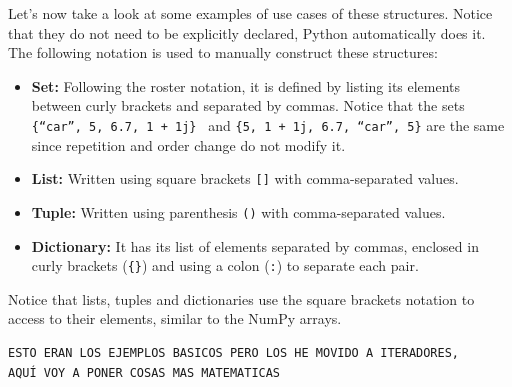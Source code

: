 Let's now take a look at some examples of use cases of these structures. 
Notice that they do not need to be explicitly declared, 
Python automatically does it. 
The following notation is used to manually construct these structures: 
\vspace{-0.5cm}
\begin{itemize}[noitemsep]
    \item \textbf{Set:} Following the roster notation, it is defined by listing its elements between curly brackets and separated by commas.
    Notice that the sets \texttt{ \{``car'', 5, 6.7, 1 + 1j\} } and \texttt{\{5, 1 + 1j, 6.7, ``car'', 5\}} 
    are the same since repetition and order change do not modify it.
    \item \textbf{List:} Written using square brackets \texttt{[]} with comma-separated values.
    \item \textbf{Tuple:} Written using parenthesis \texttt{()} with comma-separated values. 
    \item \textbf{Dictionary:} It has its list of elements separated by commas, 
    enclosed in curly brackets (\texttt{\{\}}) and 
    using a colon (\texttt{:}) to separate each pair. 
\end{itemize}

Notice that lists, tuples and dictionaries use the square brackets notation to access to their elements, similar to the NumPy arrays. 
\vspace{0.3cm} 
\lstpython
\begin{lstlisting}
ESTO ERAN LOS EJEMPLOS BASICOS PERO LOS HE MOVIDO A ITERADORES, 
AQUÍ VOY A PONER COSAS MAS MATEMATICAS
\end{lstlisting}



 











